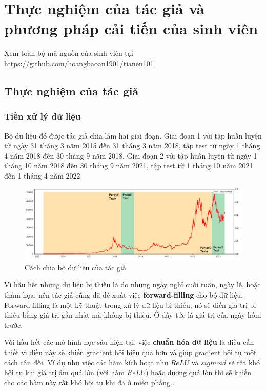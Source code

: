 \chapter{Thực nghiệm của tác giả và phương pháp cải tiến của sinh viên}

Xem toàn bộ mã nguồn của sinh viên tại \url{https://github.com/hoangbaoan1901/tianen101}

\section{Thực nghiệm của tác giả}

\subsection{Tiền xử  lý dữ liệu}
Bộ dữ liệu đó được tác giả chia làm hai giai đoạn. Giai đoạn 1 với tập huấn luyện từ ngày 31 tháng 3 năm 2015 đến 31 tháng 3 năm 2018, tập test từ ngày 1 tháng 4 năm 2018 đến 30 tháng 9 năm 2018. Giai đoạn 2 với tập huấn luyện từ ngày 1 tháng 10 năm 2018 đến 30 tháng 9 năm 2021, tập test từ 1 tháng 10 năm 2021 đến 1 tháng 4 năm 2022.


\begin{figure}[h!]
    \centering
    \includegraphics[width=\textwidth, keepaspectratio]{images/Chapter4/divine_dataset.png}
    \caption{Cách chia bộ dữ liệu của tác giả}
    \label{fig:divine_dataset}
\end{figure}


Vì hầu hết những dữ liệu bị thiếu là do những ngày nghỉ cuối tuần, ngày lễ, hoặc thảm họa, nên tác giả cũng đã đề xuất việc \textbf{forward-filling} cho bộ dữ liệu. Forward-filling là một kỹ thuật trong xử lý dữ liệu bị thiếu, nó sẽ điền giá trị bị thiếu bằng giá trị gần nhất mà không bị thiếu. Ở đây tức là giá trị của ngày hôm trước.

Với hầu hết các mô hình học sâu hiện tại, việc \textbf{chuẩn hóa dữ liệu} là điều cần thiết vì điều này sẽ khiến gradient hội hiệu quả hơn và giúp gradient hội tụ một cách cân đối. Ví dụ như việc các hàm kích hoạt như $ReLU$ và $sigmoid$ sẽ rất khó hội tụ khi giá trị âm quá lớn (với hàm $ReLU$) hoặc dương quá lớn thì sẽ khiến cho các hàm này rất khó hội tụ khi đã ở miền phẳng..

